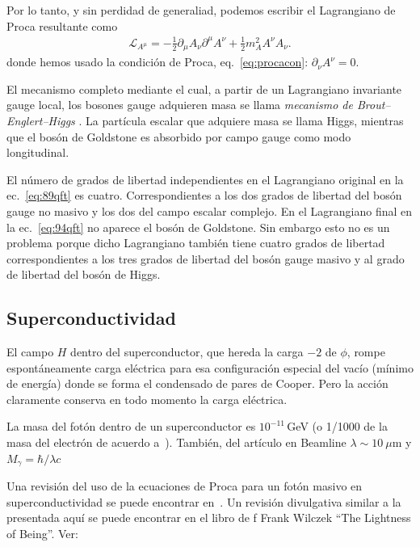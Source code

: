 \begin{frame}
Por lo tanto, y sin perdidad de generaliad, podemos escribir el Lagrangiano de Proca resultante como
\begin{align}
  \mathcal{L}_{A^\mu}=-\tfrac{1}{2}\partial_\mu A_\nu \partial^\mu A^\nu +\tfrac{1}{2}m_{A}^2 A^\nu A_\nu.
\end{align}
donde hemos usado la condición de Proca, eq.~\eqref{eq:procacon}: $\partial_\nu A^\nu=0$.

El mecanismo completo mediante el cual, a partir de un Lagrangiano invariante gauge local, los bosones gauge adquieren masa se llama \emph{mecanismo de Brout–Englert–Higgs} \cite{Englert:1964et,Higgs:1964pj}. La partícula escalar que adquiere masa se llama Higgs, mientras que el bosón de Goldstone es absorbido por campo gauge como modo longitudinal. 

El número de grados de libertad independientes en el Lagrangiano original en la ec.~\eqref{eq:89qft} es cuatro. Correspondientes a los dos grados de libertad del bosón gauge no masivo y los dos del campo escalar complejo. En el Lagrangiano final en la ec.~\eqref{eq:94qft} no aparece el bosón de Goldstone. Sin embargo esto no es un problema porque dicho Lagrangiano también tiene cuatro grados de libertad correspondientes a  los tres grados de libertad del bosón gauge masivo y al grado de libertad del bosón de Higgs. 
\end{frame}


\subsection{Superconductividad}

El campo $H$ dentro del superconductor, que hereda la carga $-2$ de
$\phi$, rompe espontáneamente carga eléctrica para esa configuración
especial del vacío (mínimo de energía) donde se forma el condensado de
pares de Cooper. Pero la acción claramente conserva en todo momento
la carga eléctrica.

La masa del fotón dentro de un superconductor es $10^{-11}\,$GeV
(o 1/1000 de la masa del electrón de acuerdo a~\cite{massivephoton}).
También, del artículo en Beamline $\lambda\sim 10\ \mu\text{m}$ y $M_\gamma=\hbar/\lambda c$ %


Una revisión del uso de la ecuaciones de Proca para un fotón masivo en superconductividad se puede encontrar en~\cite{massivephoton}.
Un revisión divulgativa similar a la presentada aquí se puede encontrar en el libro de f Frank Wilczek ``The Lightness of Being''.
Ver:


